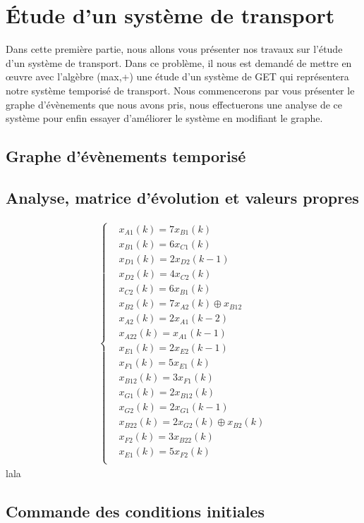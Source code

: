 \chapter{Étude d'un système de transport}
Dans cette première partie, nous allons vous présenter nos travaux sur l'étude d'un système de transport. Dans ce problème, il nous est demandé de mettre en œuvre avec l'algèbre (max,+) une étude d'un système de GET qui représentera notre système temporisé de transport. Nous commencerons par vous présenter le graphe d'évènements que nous avons pris, nous effectuerons une analyse de ce système pour enfin essayer d'améliorer le système en modifiant le graphe.

\section{Graphe d'évènements temporisé}

\section{Analyse, matrice d'évolution et valeurs propres}
\begin{align*}
\left\lbrace
\begin{aligned}
&x_{A1}(k) =7x_{B1}(k)\\ 
&x_{B1}(k) =6x_{C1}(k)\\
&x_{D1}(k) =2x_{D2}(k-1)\\
&x_{D2}(k) =4x_{C2}(k)\\
&x_{C2}(k) =6x_{B1}(k)\\
&x_{B2}(k) =7x_{A2}(k) \oplus x_{B12}\\
&x_{A2}(k) =2x_{A1}(k-2)\\
&x_{A22}(k) =x_{A1}(k-1)\\
&x_{E1}(k) =2x_{E2}(k-1)\\
&x_{F1}(k) =5x_{E1}(k)\\
&x_{B12}(k) =3x_{F1}(k)\\
&x_{G1}(k) =2x_{B12}(k)\\
&x_{G2}(k) =2x_{G1}(k-1)\\
&x_{B22}(k) =2x_{G2}(k) \oplus x_{B2}(k)\\
&x_{F2}(k) =3x_{B22}(k)\\
&x_{E1}(k) =5x_{F2}(k)   \\  
\end{aligned}
\right.
\end{align*}
lala
\section{Commande des conditions initiales}


